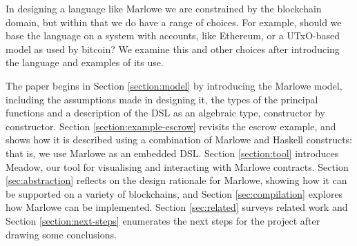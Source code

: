 \documentclass[runningheads]{llncs}
\begin{document}
In designing a language like Marlowe we are constrained by the blockchain domain, but within that we do have a range of 
choices. For example, should we base the language on a system with accounts, like Ethereum, or a UTxO-based model as 
used by bitcoin? We examine this and other choices after introducing the language and examples of its use. 


%
 
The paper begins in Section \ref{section:model} by introducing the Marlowe 
model, including the assumptions made in designing it, the types of the principal functions and a description of the 
DSL as an algebraic type, constructor by constructor. 
Section \ref{section:example-escrow} revisits the escrow example, and shows 
how it is described using a combination of Marlowe and Haskell constructs: that is, we use Marlowe as an embedded DSL. 
Section \ref{section:tool} introduces Meadow, our tool for visualising and interacting with Marlowe contracts.
Section \ref{sec:abstraction} reflects on the design rationale for Marlowe, showing how it can be supported on a variety of 
blockchains, and Section \ref{sec:compilation} explores how Marlowe can be implemented. Section \ref{sec:related} 
surveys related work and Section 
\ref{section:next-steps} enumerates the next steps for the project after drawing some conclusions.
\end{document}
